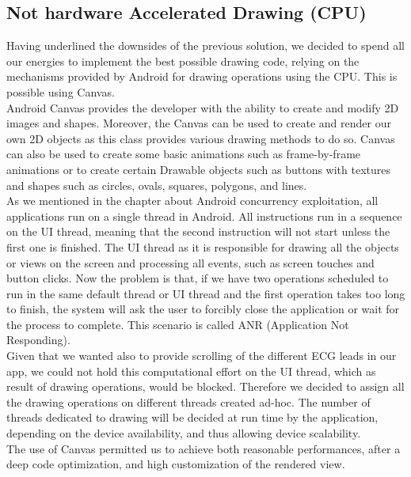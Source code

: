 \subsection{Not hardware Accelerated Drawing (CPU)}
Having underlined the downsides of the previous solution, we decided to spend all our energies to implement the best possible drawing code, relying on the mechanisms provided by Android for drawing operations using the CPU. This is possible using Canvas.\\
Android Canvas provides the developer with the ability to create and modify 2D images and shapes. Moreover, the Canvas can be used to create and render our own 2D objects as this class provides various drawing methods to do so. Canvas can also be used to create some basic animations such as frame-by-frame animations or to create certain Drawable objects such as buttons with textures and shapes such as circles, ovals, squares, polygons, and lines.\cite{ref21}\\
As we mentioned in the chapter about Android concurrency exploitation, all applications run on a single thread in Android. All instructions run in a sequence on the UI thread, meaning that the second instruction will not start unless the first one is finished. The UI thread as it is responsible for drawing all the objects or views on the screen and processing all events, such as screen touches and button clicks. Now the problem is that, if we have two operations scheduled to run in the same default thread or UI thread and the first operation takes too long to finish, the system will ask the user to forcibly close the application or wait for the process to complete. This scenario is called ANR (Application Not Responding).\\
Given that we wanted also to provide scrolling of the different ECG leads in our app, we could not hold this computational effort on the UI thread, which as result of drawing operations, would be blocked. Therefore we decided to assign all the drawing operations on different threads created ad-hoc. The number of threads dedicated to drawing will be decided at run time by the application, depending on the device availability, and thus allowing device scalability.\\
The use of Canvas permitted us to achieve both reasonable performances, after a deep code optimization, and high customization of the rendered view.